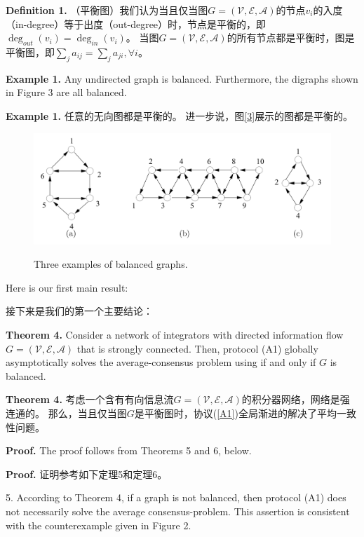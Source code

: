 \documentclass{article}
\begin{document}
\noindent \textbf{Definition 1.} （平衡图）我们认为当且仅当图$G=(\mathcal{V}, \mathcal{E}, \mathcal{A})$的节点$v_i$的入度（in-degree）等于出度（out-degree）时，节点是平衡的，即$\deg_{out}(v_i)=\deg_{in}(v_i)$。
当图$G=(\mathcal{V}, \mathcal{E}, \mathcal{A})$的所有节点都是平衡时，图是平衡图，即$\sum_{j}a_{ij} = \sum_{j}a_{ji}, \forall i$。

{\color[gray]{0.5}
\noindent \textbf{Example 1.} Any undirected graph is balanced. Furthermore, the digraphs shown in Figure 3 are all balanced.
}

\noindent \textbf{Example 1.} 任意的无向图都是平衡的。
进一步说，图\ref{3}展示的图都是平衡的。

\begin{figure}[htbp]
    \centering
    \includegraphics[width=12cm]{figures/Fig3-BalancedGraphs.jpeg}
    \label{BalancedGraphs}
    \caption{Three examples of balanced graphs.}
\end{figure}

{\color[gray]{0.5}
\noindent Here is our ﬁrst main result:
}

\noindent 接下来是我们的第一个主要结论：

{\color[gray]{0.5}
\noindent \textbf{Theorem 4.} Consider a network of integrators with directed information ﬂow $G=(\mathcal{V}, \mathcal{E}, \mathcal{A})$ that is strongly connected. 
Then, protocol (A1) globally asymptotically solves the average-consensus problem using if and only if $G$ is balanced.
}

\noindent \textbf{Theorem 4.} 考虑一个含有有向信息流$G=(\mathcal{V}, \mathcal{E}, \mathcal{A})$的积分器网络，网络是强连通的。
那么，当且仅当图$G$是平衡图时，协议(\ref{A1})全局渐进的解决了平均一致性问题。

{\color[gray]{0.5}
\noindent \textbf{Proof.} The proof follows from Theorems 5 and 6, below.
}

\noindent \textbf{Proof.} 证明参考如下定理5和定理6。

{\color[gray]{0.5}
 5. According to Theorem 4, if a graph is not balanced, then protocol (A1) does not necessarily solve the average consensus-problem. This assertion is consistent with the counterexample given in Figure 2.
}
\end{document}
